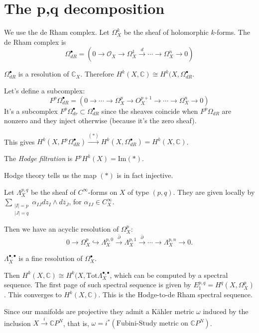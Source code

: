 \section{The p,q decomposition}
\label{section-p-q-decomposition}

\noindent
We use the de Rham complex.
Let $\Omega_X^k$ be the sheaf of holomorphic
$k$-forms.
The de Rham complex is
$$
\Omega_{dR}^\bullet
=(0 \to \mathcal{O}_X \to
\Omega_X^1\xrightarrow{d}\cdots
\to\Omega_X^n \to 0)
$$

$\Omega_{dR}^\bullet$ is a resolution of
$\mathbb{C}_X$.
Therefore $H^k(X,\mathbb{C})\cong
H^k(X,\Omega_{dR}^\bullet$.

Let's define a subcomplex:
$$
F^p\Omega_{dR}^\bullet=
(0 \to \cdots \to \Omega_X^p \to O_X^{p+1}
\to \cdots \to \Omega_X^n \to 0)
$$
It's a subcomplex $F^p\Omega_{dr}^\bullet
\subset \Omega_{dR}^\bullet$
since the sheaves coincide when
$F^p\Omega_{dR}$ are nonzero
and they inject otherwise (because it's the
zero sheaf).

This gives
$H^k(X,F^p\Omega_{dR}^\bullet)
\xrightarrow{(\ast)}
H^k(X,\Omega_{dR}^\bullet)=H^k(X,\mathbb{C})
$.

\begin{definition}
\label{definition-hodge-filtration}
The {\it Hodge filtration} is
$F^pH^k(X)=\text{Im}(\ast)$.
\end{definition}

\noindent
Hodge theory tells us the map $(\ast)$ is in
fact injective.

Let $\Lambda^{p,q}_X$ be the sheaf of
$C^\infty$-forms
on $X$ of type $(p,q)$.
They are given locally by
$\sum_{\substack{|I|=p \\ |J|=q}}
\alpha_{I J}dz_I \wedge d\overline{z}_J$,
for $\alpha_{I J}\in C^\infty_X$.

Then we have an acyclic resolution of
$\Omega_X^p$:
$$
0 \to \Omega_X^p \hookrightarrow
\Lambda^{p,0}_X
\xrightarrow{\bar{\partial}}
\Lambda^{p,1}_X
\xrightarrow{\overline{\partial}}
\cdots
\to
\Lambda^{p,n}_X\to 0.
$$

$\Lambda^{\bullet,\bullet}_X$ is a fine
resolution of $\Omega_X^\bullet$.

Then $H^k(X,\mathbb{C})\cong
H^k(X,\text{Tot}\Lambda^{\bullet,\bullet}_X$,
which can be computed by a spectral sequence.
The first page of such spectral sequence is
given by
$E^{p,q}_1=H^q(X,\Omega_X^p)$.
This converges to $H^k(X,\mathbb{C})$.
This is the Hodge-to-de Rham spectral
sequence.

\medskip\noindent
Since our manifolds are projective they admit
a Kähler metric
$\omega$ induced by the inclusion $X
\xrightarrow{i}\mathbb{C}P^N$,
that is, $\omega=i^* (\text{Fubini-Study
metric on }\mathbb{C}P^N)$.

